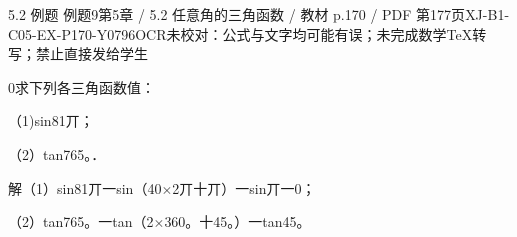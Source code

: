 \begin{bankitem}{5.2 例题 例题9}{第5章 / 5.2 任意角的三角函数 / 教材 p.170 / PDF 第177页}{XJ-B1-C05-EX-P170-Y0796}{OCR未校对：公式与文字均可能有误；未完成数学TeX转写；禁止直接发给学生}
\begin{ocrdraft}
\par
0求下列各三角函数值：
\par
（1)sin81丌；
\par
（2）tan765。．
\par
解（1）sin81丌一sin（40\ensuremath{\times}2丌十丌）一sin丌一0；
\par
（2）tan765。一tan（2\ensuremath{\times}360。十45。）一tan45。
\end{ocrdraft}
\end{bankitem}
